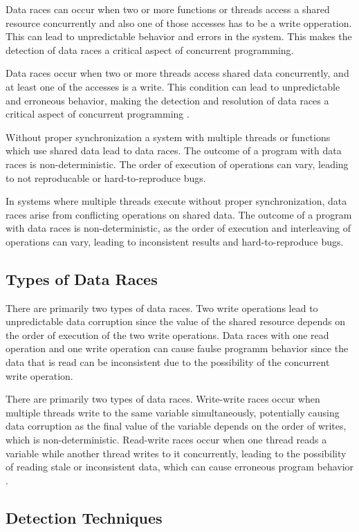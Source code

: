 \documentclass[
fancyheadings, %
%
%
]{stsreprt}
\begin{document}
{		Data races can occur when two or more functions or threads access a shared resource concurrently and also one of those accesses has to be a write opperation. This can lead to unpredictable behavior and errors in the system. This makes the detection of data races a critical aspect of concurrent programming.
		
		Data races occur when two or more threads access shared data concurrently, and at least one of the accesses is a write. This condition can lead to unpredictable and erroneous behavior, making the detection and resolution of data races a critical aspect of concurrent programming \cite{flanagan2009}.
		
		Without proper synchronization a system with multiple threads or functions which use shared data lead to data races. The outcome of a program with data races is non-deterministic. The order of execution of operations can vary, leading to not reproducable or hard-to-reproduce bugs. 
		
		
		In systems where multiple threads execute without proper synchronization, data races arise from conflicting operations on shared data. The outcome of a program with data races is non-deterministic, as the order of execution and interleaving of operations can vary, leading to inconsistent results and hard-to-reproduce bugs.
		
		\subsection{Types of Data Races}
		There are primarily two types of data races. Two write operations lead to unpredictable data corruption since the value of the shared resource depends on the order of execution of the two write operations. Data races with one read operation and one write operation can cause faulse programm behavior since the data that is read can be inconsistent due to the possibility of the concurrent write operation.
		
		
		There are primarily two types of data races. Write-write races occur when multiple threads write to the same variable simultaneously, potentially causing data corruption as the final value of the variable depends on the order of writes, which is non-deterministic. Read-write races occur when one thread reads a variable while another thread writes to it concurrently, leading to the possibility of reading stale or inconsistent data, which can cause erroneous program behavior \cite{flanagan2009}.
		
		\subsection{Detection Techniques}
		
}
\end{document}
